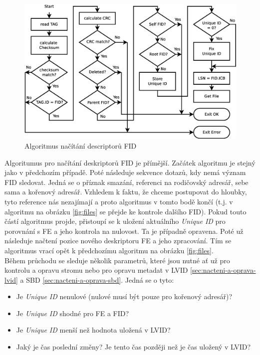 \begin{figure}[] 
    \centering
    \includegraphics[scale=0.36]{obrazky/inspect-fid.eps}
    \caption{Algoritmus načítání descriptorů FID}
    \label{fig:fid}
\end{figure}
Algoritumus pro načítání deskriptorů FID je přímější. Začátek algoritmu je stejný jako v předchozím případě. Poté následuje sekvence dotazů, kdy nemá význam FID sledovat. Jedná se o příznak smazání, referenci na rodičovský adresář, sebe sama a kořenový adresář. Vzhledem k faktu, že chceme postupovat do hloubky, tyto reference nás nezajímají a proto algoritmus v tomto bodě končí (t.j. v algoritmu na obrázku \ref{fig:files} se přejde ke kontrole dalšího FID). Pokud touto částí algoritmus projde, přistoupí se k uložení aktuálního \textit{Unique ID} pro porovnání s FE a jeho kontrola na nulovost. Ta je případně opravena. Poté už následuje načtení pozice nového deskriptoru FE a jeho zpracování. Tím se algoritmus vrací opět k předchozímu algoritmu na obrázku \ref{fig:files}.\\
Během průchodu se sleduje několik parametrů, které jsou nutné ať už pro kontrolu a opravu stromu nebo pro opravu metadat v LVID \ref{sec:nacteni-a-oprava-lvid} a SBD \ref{sec:nacteni-a-oprava-sbd}. Jedná se o tyto:
\begin{itemize}
    \item Je \textit{Unique ID} nenulové (nulové musí být pouze pro kořenový adresář)?
    \item Je \textit{Unique ID} shodné pro FE a FID?
    \item Je \textit{Unique ID} menší než hodnota uložená v LVID?
    \item Jaký je čas poslední změny? Je tento čas později než je čas uložený v LVID? 
\end{itemize}
